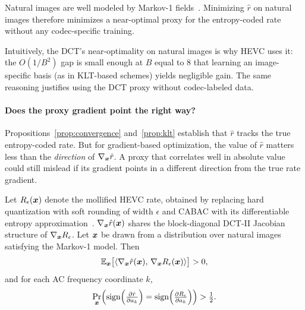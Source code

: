 \begin{corollary}
Natural images are well modeled by Markov-1 fields~\citep{habibi1971comparison}.
Minimizing $\hat{r}$ on natural images therefore minimizes a near-optimal proxy for the entropy-coded rate without any codec-specific training.
\end{corollary}

Intuitively, the DCT's near-optimality on natural images is why HEVC uses it: the $O(1/B^2)$ gap is small enough at $B$ equal to $8$ that learning an image-specific basis (as in KLT-based schemes) yields negligible gain.
The same reasoning justifies using the DCT proxy without codec-labeled data.

\paragraph{Does the proxy gradient point the right way?}
Propositions~\ref{prop:convergence} and~\ref{prop:klt} establish that $\hat{r}$ tracks the true entropy-coded rate.
But for gradient-based optimization, the value of $\hat{r}$ matters less than the \emph{direction} of $\nabla_{\boldsymbol{x}}\hat{r}$.
A proxy that correlates well in absolute value could still mislead if its gradient points in a different direction from the true rate gradient.

\begin{proposition}
\label{prop:grad}
Let $R_\epsilon(\boldsymbol{x})$ denote the mollified HEVC rate, obtained by replacing hard quantization with soft rounding of width $\epsilon$ and CABAC with its differentiable entropy approximation~\citep{balle2018variational}.
$\nabla_{\boldsymbol{x}} \hat{r}(\boldsymbol{x})$ shares the block-diagonal DCT-II Jacobian structure of $\nabla_{\boldsymbol{x}} R_\epsilon$.
Let $\boldsymbol{x}$ be drawn from a distribution over natural images satisfying the Markov-1 model.
Then
\[
  \mathbb{E}_{\boldsymbol{x}}\big[\langle \nabla_{\boldsymbol{x}}\hat r(\boldsymbol{x}),\, \nabla_{\boldsymbol{x}} R_\epsilon(\boldsymbol{x})\rangle\big] > 0,
\]
and for each AC frequency coordinate $k$,
\[
  \Pr_{\boldsymbol{x}}\!\left(\operatorname{sign}\!\left(\tfrac{\partial \hat r}{\partial a_k}\right) = \operatorname{sign}\!\left(\tfrac{\partial R_\epsilon}{\partial a_k}\right)\right) > \tfrac12.
\]
\end{proposition}

